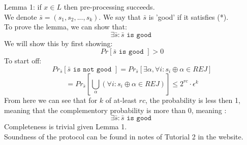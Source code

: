 Lemma 1:
if $x\in L$ then pre-processing succeeds.\\
We denote $\bar{s}=(s_1,s_2,...,s_k)$. We say that $\bar{s}$ is 'good' if it satisfies (*).\\
To prove the lemma, we can show that:
\[
    \exists \bar{s}:\bar{s}\texttt{ is good }
\]
We will show this by first showing:
\[
    Pr[\bar{s}\texttt{ is good }]>0
\]
To start off:
\[
    Pr_{\bar{s}}[\bar{s}\texttt{ is not good }]
    =Pr_{\bar{s}}[\exists\alpha, \forall i:s_i\oplus\alpha\in REJ]
\]\[
    =Pr_{\bar{s}}[\bigcup_\alpha\left(\forall i: s_i\oplus\alpha\in REJ\right)]
\leq 2^{rc}\cdot \epsilon^k
\]
From here we can see that for $k$ of at-least $rc$, the probability is less then 1, meaning that the complementory probability is more than 0, meaning :
\[
    \exists \bar{s}:\bar{s}\texttt{ is good }
\]
Completeness is trivial given Lemma 1.\\
Soundness of the protocol can be found in notes of Tutorial 2 in the website.